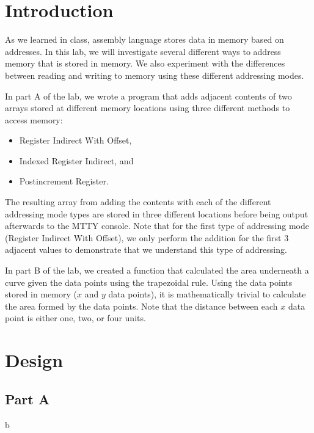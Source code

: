 \documentclass[10pt, letterpaper, titlepage]{article} %
\title{\textbf{\Huge{
\begin{center}
Introduction to\\ Addressing Modes\\
\end{center}
}}}
\author{Benjamin Kong | 1573684\\Lora Ma ||||| 1570935\\ \\ECE 212 Lab Section H11}
\begin{document}
 
\maketitle 
\thispagestyle{empty}
\tableofcontents 
\newpage
{}

\begin{multicols*}{2}


\section{Introduction}
As we learned in class, assembly language stores data in memory based on addresses. 
In this lab, we will investigate several different ways to address memory that is stored in memory. 
We also experiment with the differences between reading and writing to memory using these different addressing modes.

In part A of the lab, we wrote a program that adds adjacent contents of two arrays stored at different memory locations using three different methods to access memory:
\begin{itemize}
	\item Register Indirect With Offset,
	\item Indexed Register Indirect, and
	\item Postincrement Register.
\end{itemize}
The resulting array from adding the contents with each of the different addressing mode types are stored in three different locations before being output afterwards to the MTTY console. 
Note that for the first type of addressing mode (Register Indirect With Offset), we only perform the addition for the first 3 adjacent values to demonstrate that we understand this type of addressing.

In part B of the lab, we created a function that calculated the area underneath a curve given the data points using the trapezoidal rule. 
Using the data points stored in memory ($x$ and $y$ data points), it is mathematically trivial to calculate the area formed by the data points. 
Note that the distance between each $x$ data point is either one, two, or four units. 

\section{Design}
\subsection{Part A}
b


\end{multicols*}
\end{document}
